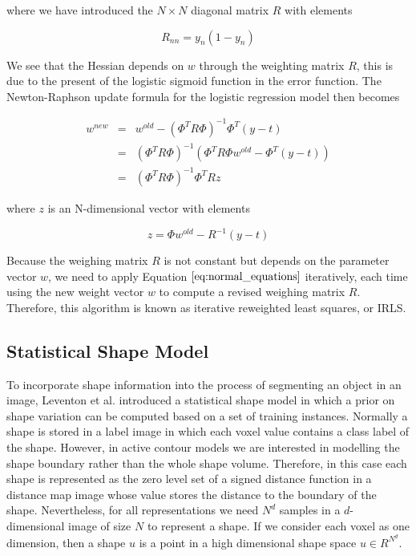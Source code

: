 \documentclass{SMBV12}
\begin{document}
where we have introduced the $N \times N$ diagonal matrix $R$ with elements

\begin{equation}
R_{nn} = y_n(1 - y_n)
\end{equation}

We see that the Hessian depends on $w$ through the weighting matrix $R$, this is due to the present of the logistic sigmoid function in the error function. The Newton-Raphson update formula for the logistic regression model then becomes

\begin{equation}
\begin{array}{lcl}
w^{new} & = & w^{old} - (\Phi^T R \Phi)^{-1}\Phi^T(y - t)\\
		& = & (\Phi^T R \Phi)^{-1}(\Phi^T R \Phi w^{old} - \Phi^T(y - t))\\
		& = & (\Phi^T R \Phi)^{-1}\Phi^T R z
\end{array}
\label{eq:normal_equations}
\end{equation}

where $z$ is an N-dimensional vector with elements

\begin{equation}
z = \Phi w^{old} - R^{-1}(y - t)
\end{equation}

Because the weighing matrix $R$ is not constant but depends on the parameter vector $w$, we need to apply Equation $\ref{eq:normal_equations}$ iteratively, each time using the new weight vector $w$ to compute a revised weighing matrix $R$. Therefore, this algorithm is known as iterative reweighted least squares, or IRLS.

\subsection{Statistical Shape Model}
\label{sec:SSM}
To incorporate shape information into the process of segmenting an object in an image, Leventon et al. \cite{leventon2000statistical} introduced a statistical shape model in which a prior on shape variation can be computed based on a set of training instances. Normally a shape is stored in a label image in which each voxel value contains a class label of the shape. However, in active contour models we are interested in modelling the shape boundary rather than the whole shape volume. Therefore, in this case each shape is represented as the zero level set of a signed distance function in a distance map image whose value stores the distance to the boundary of the shape. Nevertheless, for all representations we need $N^d$ samples in a $d$-dimensional image of size $N$ to represent a shape. If we consider each voxel as one dimension, then a shape $u$ is a point in a high dimensional shape space $u \in R^{N^d}$.
\end{document}
